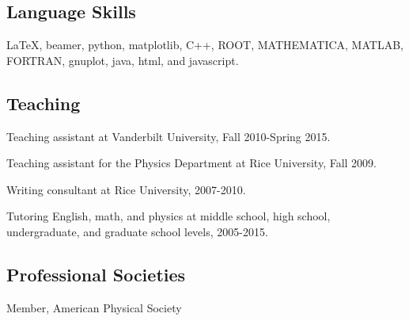 \documentclass[letterpaper]{article}
\renewenvironment{itemize}{
\begin{list}{}{
\setlength{\leftmargin}{1.5em}
}
}{
\end{list}
}
\begin{document}
\subsection*{Language Skills}
\begin{itemize}
\item 
\LaTeX, beamer, python, matplotlib, C++, ROOT, MATHEMATICA, MATLAB, FORTRAN, gnuplot, java, html, and javascript.
\end{itemize}

\subsection*{Teaching}
\begin{itemize}
\item Teaching assistant at Vanderbilt University, Fall 2010-Spring 2015.
\item Teaching assistant for the Physics Department at Rice University, Fall 2009.
\item Writing consultant at Rice University, 2007-2010.
\item Tutoring English, math, and physics at middle school, high school, undergraduate, and graduate school levels, 2005-2015.
\end{itemize}

\subsection*{Professional Societies}
\begin{itemize}
\item Member, American Physical Society
\end{itemize}
\end{document}
